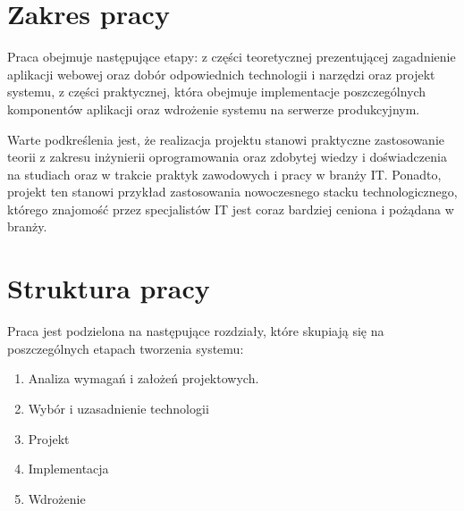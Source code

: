 \section*{Zakres pracy}

Praca obejmuje następujące etapy: z części teoretycznej prezentującej zagadnienie aplikacji webowej oraz dobór odpowiednich technologii i narzędzi oraz projekt systemu,
z części praktycznej, która obejmuje implementacje poszczególnych komponentów aplikacji oraz wdrożenie systemu na serwerze produkcyjnym.

Warte podkreślenia jest, że realizacja projektu stanowi praktyczne zastosowanie teorii z zakresu inżynierii oprogramowania oraz zdobytej wiedzy i doświadczenia na studiach
oraz w trakcie praktyk zawodowych i pracy w branży IT. Ponadto, projekt ten stanowi przykład zastosowania nowoczesnego stacku technologicznego, którego znajomość przez specjalistów IT jest coraz bardziej ceniona i pożądana w branży.

\section*{Struktura pracy}

Praca jest podzielona na następujące rozdziały, które skupiają się na poszczególnych etapach tworzenia systemu:

\begin{enumerate}
	\item Analiza wymagań i założeń projektowych.
	\item Wybór i uzasadnienie technologii
	\item Projekt
	\item Implementacja
	\item Wdrożenie
\end{enumerate}



